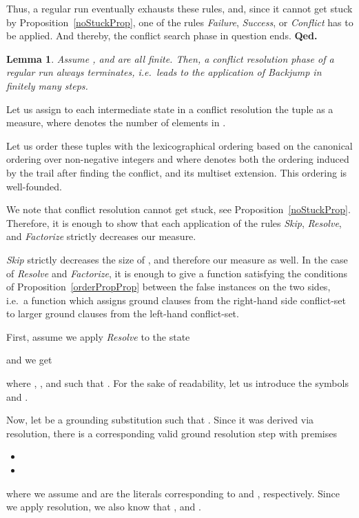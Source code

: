 \documentclass[a4paper]{article}
\newcommand{\startproof}{{\bf Proof:~}}
\newcommand{\finishproof}{{\bf Qed.}}
\newtheorem{lemm}[defi]{Lemma}
\begin{document}
{Thus, a regular run eventually exhausts these rules, and, since it cannot get stuck by Proposition~\ref{noStuckProp}, one of the rules 
\emph{Failure}, \emph{Success}, or \emph{Conflict} has to be applied. And thereby, the conflict search phase in question ends.
\finishproof

\begin{lemm}\label{crTerminatesTheo} Assume ,  and  are all finite.
Then, a conflict resolution phase of a regular run always terminates, i.e.\ 
leads to the application of 
\emph{Backjump} in finitely many steps.
\end{lemm}
\noindent\startproof
Let us assign to each intermediate state  in a conflict resolution 
the tuple  as a measure, where  denotes 
the number of elements in . 

Let us order these tuples with the lexicographical ordering  based on the canonical ordering over non-negative integers and  
where  denotes both the ordering induced by the trail 
after finding the conflict, and its multiset extension. 
This ordering is well-founded.

We note that conflict resolution cannot get stuck, see Proposition~\ref{noStuckProp}. 
Therefore, it is enough to show that each application of the rules \emph{Skip}, \emph{Resolve}, and \emph{Factorize} strictly 
decreases our measure.

\emph{Skip} strictly decreases the size of , and therefore our measure as well. 
In the case of \emph{Resolve} and \emph{Factorize}, 
it is enough to give a function satisfying the conditions of Proposition~\ref{orderPropProp} 
between the false instances on the two sides, i.e.\ 
a function 
which assigns ground clauses from the right-hand side conflict-set to 
larger ground clauses from the left-hand conflict-set.

First, assume we apply \emph{Resolve} to the state 
	
and we get
  
where , 
, and 
 such that . 
For the sake of readability, let us introduce the symbols  and .

Now, let  be a grounding substitution such that . Since it was derived via resolution, 
there is a corresponding valid ground resolution step with premises 
	\begin{itemize}
		\item 
		\item 
	\end{itemize}
where we assume  and  are the literals corresponding to  and , respectively. 
Since we apply resolution, we also know that , and .

}
\end{document}
